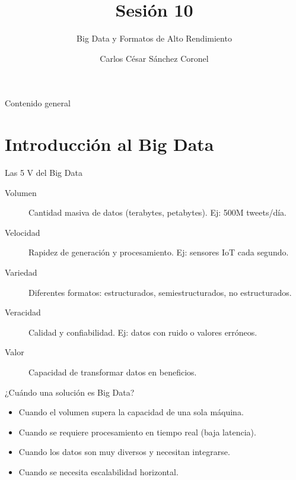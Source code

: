 \documentclass[aspectratio=169, 10pt, xcolor=table]{beamer}
\title[SESIÓN 10 BBDD]{\textbf{Sesión 10}}
\subtitle{Big Data y Formatos de Alto Rendimiento}
\author[Prof. C. Sánchez]{Carlos César Sánchez Coronel}
\institute{\textbf{BASES DE DATOS}}
\date{}
\begin{document}
\begin{frame}
    \titlepage
\end{frame}

\begin{frame}{Contenido general}
    \tableofcontents
\end{frame}

\section{Introducción al Big Data}

\begin{frame}{Las 5 V del Big Data}
    \begin{description}
        \item[Volumen] Cantidad masiva de datos (terabytes, petabytes). Ej: 500M tweets/día.
        \item[Velocidad] Rapidez de generación y procesamiento. Ej: sensores IoT cada segundo.
        \item[Variedad] Diferentes formatos: estructurados, semiestructurados, no estructurados.
        \item[Veracidad] Calidad y confiabilidad. Ej: datos con ruido o valores erróneos.
        \item[Valor] Capacidad de transformar datos en beneficios.
    \end{description}
\end{frame}

\begin{frame}{¿Cuándo una solución es Big Data?}
    \begin{itemize}
        \item Cuando el volumen supera la capacidad de una sola máquina.
        \item Cuando se requiere procesamiento en tiempo real (baja latencia).
        \item Cuando los datos son muy diversos y necesitan integrarse.
        \item Cuando se necesita escalabilidad horizontal.
    \end{itemize}
\end{frame}

\end{document}
